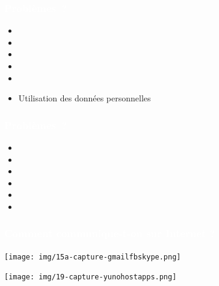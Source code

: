 \documentclass[notes=hide]{beamer}
\begin{document}
\begin{frame}
  \frametitle{\textcolor{white}{Problèmes~?}}
  \begin{itemize}
    \item
    \item
    \item
    \item
    \item
    \item Utilisation des données personnelles
  \end{itemize}
\end{frame}

\begin{frame}
  \frametitle{\textcolor{white}{Problèmes~?}}
  \begin{itemize}
    \item
    \item
    \item
    \item
    \item
    \item
  \end{itemize}
\end{frame}

\begin{frame}[t,plain]
\begin{center}
\vspace{\fill}
  \vspace{\fill}
\end{center}
\end{frame}

\begin{frame}[t,plain]
\begin{center}
\vspace{\fill}
  \vspace{\fill}
\end{center}
\end{frame}

\begin{frame}[t]
  \frametitle{\textcolor{white}{Comment communique-t-on sur Internet ?}}
\begin{center}
\vfill
\texttt{[image: img/15a-capture-gmailfbskype.png]}
\vfill
\end{center}
\end{frame}

\begin{frame}[t]
\begin{center}
\vfill
\texttt{[image: img/19-capture-yunohostapps.png]}
\vfill
\end{center}
\end{frame}
\end{document}
